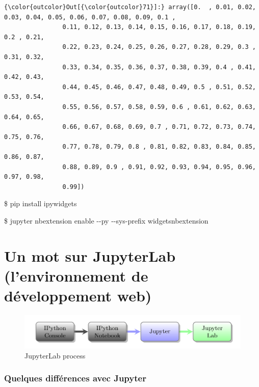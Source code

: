 \documentclass[11pt]{article}
\makeatletter
\def\maxwidth{\ifdim\Gin@nat@width>\linewidth\linewidth
    \else\Gin@nat@width\fi}
\let\Oldincludegraphics\includegraphics
\renewcommand{\includegraphics}[1]{\Oldincludegraphics[width=.8\maxwidth]{#1}}
\makeatother
\begin{document}
    
\begin{Verbatim}[commandchars=\\\{\}]
{\color{outcolor}Out[{\color{outcolor}71}]:} array([0.  , 0.01, 0.02, 0.03, 0.04, 0.05, 0.06, 0.07, 0.08, 0.09, 0.1 ,
                0.11, 0.12, 0.13, 0.14, 0.15, 0.16, 0.17, 0.18, 0.19, 0.2 , 0.21,
                0.22, 0.23, 0.24, 0.25, 0.26, 0.27, 0.28, 0.29, 0.3 , 0.31, 0.32,
                0.33, 0.34, 0.35, 0.36, 0.37, 0.38, 0.39, 0.4 , 0.41, 0.42, 0.43,
                0.44, 0.45, 0.46, 0.47, 0.48, 0.49, 0.5 , 0.51, 0.52, 0.53, 0.54,
                0.55, 0.56, 0.57, 0.58, 0.59, 0.6 , 0.61, 0.62, 0.63, 0.64, 0.65,
                0.66, 0.67, 0.68, 0.69, 0.7 , 0.71, 0.72, 0.73, 0.74, 0.75, 0.76,
                0.77, 0.78, 0.79, 0.8 , 0.81, 0.82, 0.83, 0.84, 0.85, 0.86, 0.87,
                0.88, 0.89, 0.9 , 0.91, 0.92, 0.93, 0.94, 0.95, 0.96, 0.97, 0.98,
                0.99])
\end{Verbatim}
            
    \$ pip install ipywidgets

\$ jupyter nbextension enable -\/-py -\/-sys-prefix widgetsnbextension

    \section{Un mot sur JupyterLab (l'environnement de développement
web)}\label{un-mot-sur-jupyterlab-lenvironnement-de-duxe9veloppement-web}

\begin{figure}
\centering
\includegraphics{images/diag-2.png}
\caption{JupyterLab process}
\end{figure}

    \subsubsection{Quelques différences avec
Jupyter}\label{quelques-diffuxe9rences-avec-jupyter}
\end{document}
